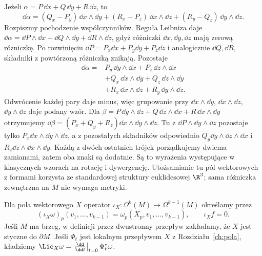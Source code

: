 \begin{przyklad}[Rachunek na $\R^3$]
\label{prz:formy-rachunek-r3}
Jeżeli $\alpha=P\,\dd x+Q\,\dd y+R\,\dd z$, to
\[
 \dd\alpha=(Q_x-P_y)\,\dd x\wedge\dd y
 +(R_x-P_z)\,\dd x\wedge\dd z
 +(R_y-Q_z)\,\dd y\wedge\dd z.
\]
Rozpiszmy pochodzenie współczynników. Reguła Leibniza daje
$\dd\alpha=\dd P\wedge\dd x+\dd Q\wedge\dd y+\dd R\wedge\dd z$,
gdyż różniczki $\dd x,\dd y,\dd z$ mają zerową różniczkę.
Po rozwinięciu $\dd P=P_x\dd x+P_y\dd y+P_z\dd z$
i analogicznie $\dd Q,\dd R$, składniki z powtórzoną
różniczką znikają. Pozostaje
\[
 \begin{aligned}
 \dd\alpha={}&P_y\,\dd y\wedge\dd x+P_z\,\dd z\wedge\dd x\\
 &+Q_x\,\dd x\wedge\dd y+Q_z\,\dd z\wedge\dd y\\
 &+R_x\,\dd x\wedge\dd z+R_y\,\dd y\wedge\dd z.
 \end{aligned}
\]
Odwrócenie każdej pary daje minus, więc grupowanie
przy $\dd x\wedge\dd y$, $\dd x\wedge\dd z$,
$\dd y\wedge\dd z$ daje podany wzór.
Dla $\beta=P\,\dd y\wedge\dd z
+Q\,\dd z\wedge\dd x+R\,\dd x\wedge\dd y$
otrzymujemy $\dd\beta=(P_x+Q_y+R_z)
\dd x\wedge\dd y\wedge\dd z$.
Tu z $\dd P\wedge\dd y\wedge\dd z$ pozostaje tylko
$P_x\dd x\wedge\dd y\wedge\dd z$, a z pozostałych
składników odpowiednio $Q_y\dd y\wedge\dd z\wedge\dd x$
i $R_z\dd z\wedge\dd x\wedge\dd y$.
Każdą z dwóch ostatnich trójek porządkujemy dwiema zamianami,
zatem oba znaki są dodatnie.
Są to wyrażenia występujące w klasycznych wzorach na rotację
i dywergencję. Utożsamianie tu pól wektorowych z formami
korzysta ze standardowej struktury euklidesowej $\R^3$;
sama różniczka zewnętrzna na $M$ nie wymaga metryki.
\end{przyklad}

\begin{definicja}
\label{def:formy-kontrakcja-lie}
Dla pola wektorowego $X$ operator
$\iota_X:\Omega^k(M)\to\Omega^{k-1}(M)$ określamy przez
\[
 (\iota_X\omega)_p(v_1,\ldots,v_{k-1})
 =\omega_p(X_p,v_1,\ldots,v_{k-1}),
 \qquad \iota_Xf=0.
\]
Jeśli $M$ ma brzeg, w definicji przez dwustronny przepływ
zakładamy, że $X$ jest styczne do $\partial M$.
Jeśli $\Phi_t$ jest lokalnym przepływem $X$ z
Rozdziału~\ref{ch:pola}, kładziemy
$\Lie_X\omega=\left.\frac{\dd}{\dd t}\right|_{t=0}\Phi_t^*\omega$.
\end{definicja}

